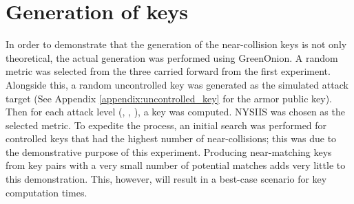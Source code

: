 \section{Generation of keys}
\label{sec:key_gen}
In order to demonstrate that the generation of the near-collision keys is not only theoretical, the actual generation was performed using GreenOnion. A random metric was selected from the three carried forward from the first experiment. Alongside this, a random uncontrolled key was generated as the simulated attack target (See Appendix \ref{appendix:uncontrolled_key} for the armor public key). Then for each attack level (\OOOO, \XOOO, \XOOX), a key was computed. NYSIIS was chosen as the selected metric. To expedite the process, an initial search was performed for controlled keys that had the highest number of near-collisions; this was due to the demonstrative purpose of this experiment. Producing near-matching keys from key pairs with a very small number of potential matches adds very little to this demonstration. This, however, will result in a best-case scenario for key computation times.

